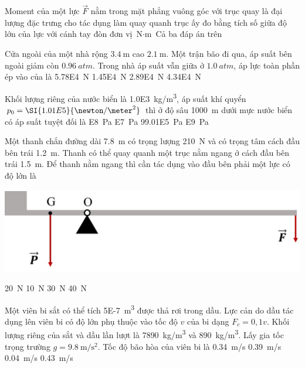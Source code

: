 \begin{ex}
	Moment của một lực $\vec{F}$ nằm trong mặt phẳng vuông góc với trục quay là
	\choice
	{đại lượng đặc trưng cho tác dụng làm quay quanh trục ấy}
	{đo bằng tích số giữa độ lớn của lực với cánh tay đòn}
	{đơn vị $\si{\newton\cdot\meter}$}
	{\True Cả ba đáp án trên}
	\loigiai{}
\end{ex}
\begin{ex}
	Cửa ngoài của một nhà rộng $\SI{3.4}{\meter}$ cao $\SI{2.1}{\meter}$. Một trận bão đi qua, áp suất bên ngoài giảm còn $\SI{0.96}{atm}$. Trong nhà áp suất vẫn giữa ở $\SI{1.0}{atm}$, áp lực toàn phần ép vào của là
	\choice
	{\SI{5.78E4}{\newton}}
	{\SI{1.45E4}{\newton}}
	{\True \SI{2.89E4}{\newton}}
	{\SI{4.34E4}{\newton}}
	\loigiai{}
\end{ex}
\begin{ex}
Khối lượng riêng của nước biển là \SI{1.0E3}{\kilogram/\meter^3}, áp suất khí quyển $p_0=\SI{1.01E5}{\newton/\meter^2}$ thì ở độ sâu \SI{1000}{\meter} dưới mực nước biển có áp suất tuyệt đối là	
	\choice
	{\SI{E8}{\pascal}}
	{\True \SI{E7}{\pascal}}
	{\SI{99.01E5}{\pascal}}
	{\SI{E9}{\pascal}}
	\loigiai{}
\end{ex}
\begin{ex}
	Một thanh chắn đường dài \SI{7.8}{\meter} có trọng lượng \SI{210}{\newton} và có trọng tâm cách đầu bên trái \SI{1.2}{\meter}. Thanh có thể quay quanh một trục nằm ngang ở cách đầu bên trái \SI{1.5}{\meter}. Để thanh nằm ngang thì cần tác dụng vào đầu bên phải một lực có độ lớn là
	\begin{center}
		\includegraphics[scale=0.5]{../figs/D10-KTTX3-002-8}
	\end{center}
	\choice
	{\SI{20}{\newton}}
	{\True \SI{10}{\newton}}
	{\SI{30}{\newton}}
	{\SI{40}{\newton}}
	\loigiai{}
\end{ex}
\begin{ex}
	Một viên bi sắt có thể tích \SI{5E-7}{\meter^3} được thả rơi trong dầu. Lực cản do dầu tác dụng lên viên bi có độ lớn phụ thuộc vào tốc độ $v$ của bi dạng $F_c=0,1v$. Khối lượng riêng của sắt và dầu lần lượt là \SI{7890}{\kilogram/\meter^3} và \SI{890}{\kilogram/\meter^3}. Lấy gia tốc trọng trường $g=\SI{9.8}{\meter/\second^2}$. Tốc độ bão hòa của viên bi là
	\choice
	{\True \SI{0.34}{\meter/\second}}
	{\SI{0.39}{\meter/\second}}
	{\SI{0.04}{\meter/\second}}
	{\SI{0.43}{\meter/\second}}
	\loigiai{}
\end{ex}
